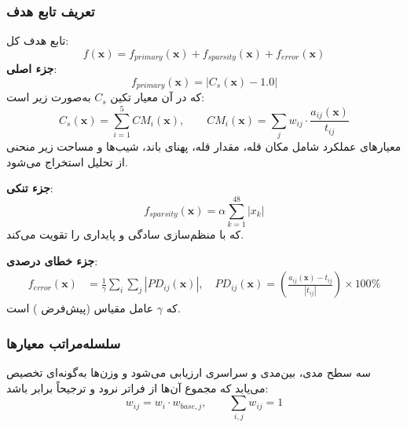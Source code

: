 \subsubsection{تعریف تابع هدف}
تابع هدف کل:
\begin{equation}\label{Eq.objective_function_detailed}
f(\mathbf{x}) = f_{primary}(\mathbf{x}) + f_{sparsity}(\mathbf{x}) + f_{error}(\mathbf{x})
\end{equation}
\textbf{جزء اصلی}:
\begin{equation}\label{Eq.primary_objective_detailed}
 f_{primary}(\mathbf{x}) = \left| C_s(\mathbf{x}) - 1.0 \right|
\end{equation}
که در آن معیار تکین $C_s$ به‌صورت زیر است:
\begin{equation}\label{Eq.singular_response_detailed}
C_s(\mathbf{x}) = \sum_{i=1}^{5} CM_i(\mathbf{x}),\qquad CM_i(\mathbf{x}) = \sum_j w_{ij} \cdot \frac{a_{ij}(\mathbf{x})}{t_{ij}}
\end{equation}
معیارهای عملکرد شامل مکان قله، مقدار قله، پهنای باند، شیب‌ها و مساحت زیر منحنی از تحلیل  استخراج می‌شود.

\textbf{جزء تنکی}:
\begin{equation}\label{Eq.sparsity_penalty_detailed}
 f_{sparsity}(\mathbf{x}) = \alpha \sum_{k=1}^{48} |x_k|
\end{equation}
که با منظم‌سازی  سادگی و پایداری را تقویت می‌کند.

\textbf{جزء خطای درصدی}:
\begin{align}\label{Eq.percentage_error_detailed}
f_{error}(\mathbf{x}) &= \frac{1}{\gamma} \sum_{i} \sum_{j} \left| PD_{ij}(\mathbf{x}) \right|,\quad
PD_{ij}(\mathbf{x}) = \left( \frac{a_{ij}(\mathbf{x}) - t_{ij}}{|t_{ij}|} \right) \times 100\%
\end{align}
که $\gamma$ عامل مقیاس (پیش‌فرض ) است.

\subsubsection{سلسله‌مراتب معیارها}
سه سطح مدی، بین‌مدی و سراسری ارزیابی می‌شود و وزن‌ها به‌گونه‌ای تخصیص می‌یابد که مجموع آن‌ها از  فراتر نرود و ترجیحاً برابر  باشد:
\begin{equation}\label{Eq.weight_hierarchy_detailed}
 w_{ij} = w_i \cdot w_{base,j},\qquad \sum_{i,j} w_{ij} = 1
\end{equation}

